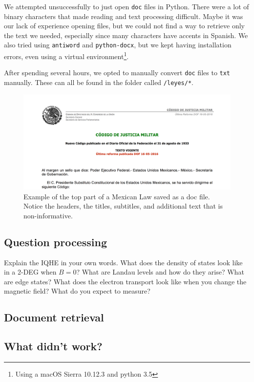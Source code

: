 \documentclass[letterpaper]{article}
\begin{document}
We attempted unsuccessfully to just open \texttt{doc} files in Python. There were a lot of binary characters that made reading and text processing difficult. Maybe it was our lack of experience opening files, but we could not find a way to retrieve only the text we needed, especially since many characters have accents in Spanish. We also tried using \texttt{antiword} and \texttt{python-docx}, but we kept having installation errors, even using a virtual environment\footnote{Using a macOS Sierra 10.12.3 and python 3.5}.

After spending several hours, we opted to manually convert \texttt{doc} files to \texttt{txt} manually. These can all be found in the folder called \texttt{/leyes/*}.

\begin{figure}
\centering
\includegraphics[width=1\textwidth]{header.png}
\caption{\label{fig:header}Example of the top part of a Mexican Law saved as a doc file. Notice the headers, the titles, subtitles, and additional text that is non-informative.}
\end{figure}

\subsection{Question processing}
Explain the IQHE in your own words. What does the density of states look like in a 2-DEG when $B=0$? What are Landau levels and how do they arise? What are edge states? What does the electron transport look like when you change the magnetic field? What do you expect to measure?

\subsection{Document retrieval}


\subsection{What didn't work?}
\end{document}
